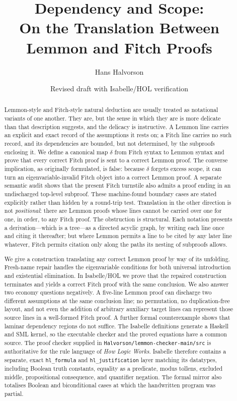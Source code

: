 \documentclass[11pt]{article}
\title{Dependency and Scope:\\
       On the Translation Between Lemmon and Fitch Proofs}
\author{Hans Halvorson}
\date{Revised draft with Isabelle/HOL verification}
\theoremstyle{plain}
\theoremstyle{definition}
\theoremstyle{remark}
\begin{document}
\maketitle

\begin{abstract}
Lemmon-style and Fitch-style natural deduction are usually treated as
notational variants of one another. They are, but the sense in which they are
is more delicate than that description suggests, and the delicacy is
instructive. A Lemmon line carries an explicit and exact record of the
assumptions it rests on; a Fitch line carries no such record, and its
dependencies are bounded, but not determined, by the subproofs enclosing it.
We define a canonical map $\delta$ from Fitch syntax to Lemmon syntax and
prove that every correct Fitch proof is sent to a correct Lemmon proof.
The converse implication, as originally formulated, is false: because
$\delta$ forgets excess scope, it can turn an eigenvariable-invalid Fitch
object into a correct Lemmon proof. A separate semantic audit shows that the
present Fitch turnstile also admits a proof ending in an undischarged
top-level subproof. These machine-found boundary cases are stated explicitly
rather than hidden by a round-trip test. Translation in the other direction is not
\emph{positional}: there are Lemmon proofs whose lines cannot be carried over
one for one, in order, to any Fitch proof. The obstruction is structural.
Each notation presents a derivation---which is a tree---as a directed acyclic
graph, by writing each line once and citing it thereafter; but where Lemmon
permits a line to be cited by any later line whatever, Fitch permits citation
only along the paths its nesting of subproofs allows.

We give a construction translating any correct Lemmon proof by way of its
unfolding. Fresh-name repair handles the eigenvariable conditions for both
universal introduction and existential elimination. In Isabelle/HOL we prove
that the repaired construction terminates and yields a correct Fitch proof
with the same conclusion. We also answer two economy questions negatively. A
five-line Lemmon proof can discharge two different assumptions at the same
conclusion line; no permutation, no duplication-free layout, and not even the
addition of arbitrary auxiliary target lines can represent those source lines
in a well-formed Fitch proof. A further formal counterexample shows that
laminar dependency regions do not suffice. The Isabelle definitions generate
a Haskell and SML kernel, so the executable checker and the proved equations
have a common source. The proof checker supplied in
\verb|Halvorson/lemmon-checker-main/src| is authoritative for the rule language
of \emph{How Logic Works}. Isabelle therefore contains a separate, exact
\verb|hl_formula| and \verb|hl_justification| layer matching its datatypes,
including Boolean truth constants, equality as a predicate, modus tollens,
excluded middle, propositional consequence, and quantifier negation. The
formal mirror also totalises Boolean and biconditional cases at which the
handwritten program was partial.
\end{abstract}
\end{document}
